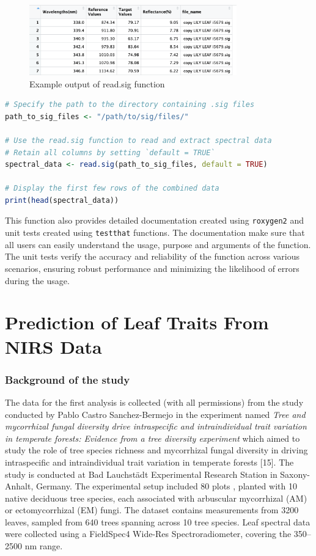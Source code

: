 \documentclass[12pt,a4paper]{report}
\begin{document}
\begin{figure}[h]
    \centering
    \includegraphics[width=0.8\textwidth]{Figures/read_sig.png}
    \caption{Example output of read.sig function}
    \label{fig:read_sig}
\end{figure}

\begin{lstlisting}[language=R, style=mystyle]
# Specify the path to the directory containing .sig files
path_to_sig_files <- "/path/to/sig/files/"

# Use the read.sig function to read and extract spectral data
# Retain all columns by setting `default = TRUE`
spectral_data <- read.sig(path_to_sig_files, default = TRUE)

# Display the first few rows of the combined data
print(head(spectral_data))
\end{lstlisting}

This function also provides detailed documentation created using \texttt{roxygen2} and unit tests created using \texttt{testthat} functions. The documentation make sure that all users can easily understand the  usage, purpose and arguments of the function. The unit tests verify the accuracy and reliability of the function across various scenarios, ensuring robust performance and minimizing the likelihood of errors during the usage.

\section{Prediction of Leaf Traits From NIRS Data} 
\subsubsection*{Background of the study}
The data for the first analysis is collected (with all permissions) from the study conducted by Pablo Castro Sanchez-Bermejo in the experiment named \textit{Tree and mycorrhizal fungal diversity drive intraspecific and intraindividual trait variation in temperate forests: Evidence from a tree diversity experiment} which aimed to study the role of tree species richness and mycorrhizal fungal diversity in driving intraspecific and intraindividual trait variation in temperate forests [15]. The study is conducted at Bad Lauchstädt Experimental Research Station in Saxony-Anhalt, Germany. The experimental setup included 80 plots , planted with 10 native deciduous tree species, each associated with arbuscular mycorrhizal (AM) or ectomycorrhizal (EM) fungi. The dataset contains measurements from 3200 leaves, sampled from 640 trees spanning across 10 tree species. Leaf spectral data were collected using a FieldSpec4 Wide-Res Spectroradiometer, covering the 350–2500 nm range. \\
\end{document}
